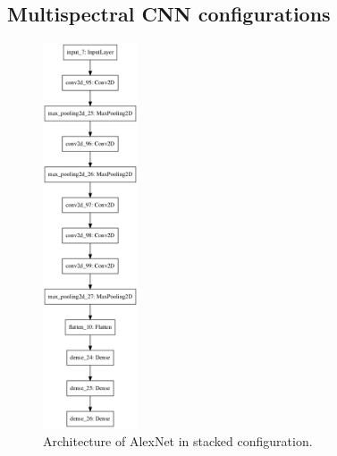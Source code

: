 \documentclass{l4proj}
\begin{document}
\begin{appendices}


\chapter{Multispectral CNN configurations}
\label{appendix_arch}

\begin{figure}[ht]
  \centering
  \includegraphics[width=0.25\textwidth]{images/models/keras/stacked.png}
  \caption{Architecture of AlexNet in stacked configuration.}
\end{figure}


\end{appendices}
\end{document}
